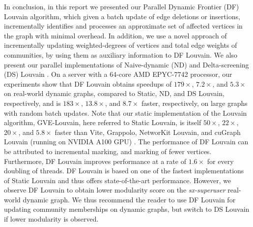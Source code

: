 In conclusion, in this report we presented our Parallel Dynamic Frontier (DF) Louvain algorithm, which given a batch update of edge deletions or insertions, incrementally identifies and processes an approximate set of affected vertices in the graph with minimal overhead. In addition, we use a novel approach of incrementally updating weighted-degrees of vertices and total edge weights of communities, by using them as auxiliary information to DF Louvain. We also present our parallel implementations of Naive-dynamic (ND) \cite{com-aynaud10} and Delta-screening (DS) Louvain \cite{com-zarayeneh21}. On a server with a 64-core AMD EPYC-7742 processor, our experiments show that DF Louvain obtains speedups of $179\times$, $7.2\times$, and $5.3\times$ on real-world dynamic graphs, compared to Static, ND, and DS Louvain, respectively, and is $183\times$, $13.8\times$, and $8.7\times$ faster, respectively, on large graphs with random batch updates. Note that our static implementation of the Louvain algorithm, GVE-Louvain, here referred to Static Louvain, is itself $50\times$, $22\times$, $20\times$, and $5.8\times$ faster than Vite, Grappolo, NetworKit Louvain, and cuGraph Louvain (running on NVIDIA A100 GPU) \cite{sahu2023gvelouvain}. The performance of DF Louvain can be attributed to incremental marking, and marking of fewer vertices. Furthermore, DF Louvain improves performance at a rate of $1.6\times$ for every doubling of threads. DF Louvain is based on one of the fastest implementations of Static Louvain \cite{sahu2023gvelouvain} and thus offers state-of-the-art performance. However, we observe DF Louvain to obtain lower modularity score on the \textit{sx-superuser} real-world dynamic graph. We thus recommend the reader to use DF Louvain for updating community memberships on dynamic graphs, but switch to DS Louvain if lower modularity is observed.
